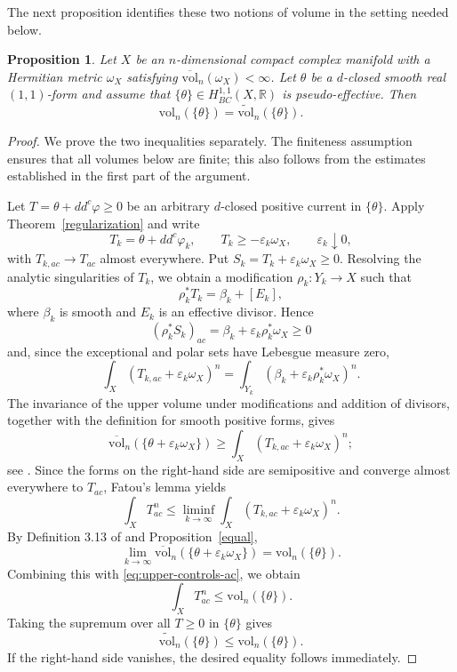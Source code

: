 \documentclass[11pt,letterpaper]{amsart}
\numberwithin{equation}{section}
\newcommand{\RR}{\mathbb{R}}
\newtheorem{prop}{Proposition}[section]
\begin{document}
The next proposition identifies these two notions of volume in the setting needed below.
\begin{prop}\label{good}
Let $X$ be an $n$-dimensional compact complex manifold with a Hermitian metric
$\omega_X$ satisfying $\overline{\mathrm{vol}}_n(\omega_X)<\infty$. Let
$\theta$ be a $d$-closed smooth real $(1,1)$-form and assume that $\{\theta\}\in H^{1,1}_{BC}(X,\RR)$ is pseudo-effective. Then
\[
 \mathrm{vol}_n(\{\theta\})=\widetilde{\mathrm{vol}}_n(\{\theta\}).
\]
\end{prop}
\begin{proof}
We prove the two inequalities separately. The finiteness assumption ensures that all volumes below are finite; this also follows from the estimates established in the first part of the argument.

Let $T=\theta+dd^c\varphi\ge0$ be an arbitrary $d$-closed positive current in
$\{\theta\}$. Apply Theorem~\ref{regularization} and write
\[
 T_k=\theta+dd^c\varphi_k,\qquad
 T_k\ge-\varepsilon_k\omega_X,\qquad
 \varepsilon_k\downarrow0,
\]
with $T_{k,ac}\to T_{ac}$ almost everywhere. Put
$S_k=T_k+\varepsilon_k\omega_X\ge0$. Resolving the analytic singularities of
$T_k$, we obtain a modification $\rho_k:Y_k\to X$ such that
\[
 \rho_k^*T_k=\beta_k+[E_k],
\]
where $\beta_k$ is smooth and $E_k$ is an effective divisor. Hence
\[
 (\rho_k^*S_k)_{ac}=\beta_k+\varepsilon_k\rho_k^*\omega_X\ge0
\]
and, since the exceptional and polar sets have Lebesgue measure zero,
\begin{equation}\label{eq:regularized-ac-mass}
 \int_X(T_{k,ac}+\varepsilon_k\omega_X)^n
 =\int_{Y_k}(\beta_k+\varepsilon_k\rho_k^*\omega_X)^n.
\end{equation}
The invariance of the upper volume under modifications and addition of divisors, together with the definition for smooth positive forms, gives
\begin{equation}\label{eq:upper-controls-ac}
 \overline{\mathrm{vol}}_n(\{\theta+\varepsilon_k\omega_X\})
 \ge \int_X(T_{k,ac}+\varepsilon_k\omega_X)^n;
\end{equation}
see \cite[Lemma 3.5 and Definition 3.8]{BGL}. Since the forms on the right-hand
side are semipositive and converge almost everywhere to $T_{ac}$, Fatou's lemma
yields
\[
 \int_XT_{ac}^n
 \le\liminf_{k\to\infty}
 \int_X(T_{k,ac}+\varepsilon_k\omega_X)^n.
\]
By Definition 3.13 of \cite{BGL} and Proposition~\ref{equal},
\[
 \lim_{k\to\infty}
 \overline{\mathrm{vol}}_n(\{\theta+\varepsilon_k\omega_X\})
 =\mathrm{vol}_n(\{\theta\}).
\]
Combining this with \eqref{eq:upper-controls-ac}, we obtain
\[
 \int_XT_{ac}^n\le\mathrm{vol}_n(\{\theta\}).
\]
Taking the supremum over all $T\ge0$ in $\{\theta\}$ gives
\begin{equation}\label{eq:tilde-le-volume}
 \widetilde{\mathrm{vol}}_n(\{\theta\})
 \le\mathrm{vol}_n(\{\theta\}).
\end{equation}
If the right-hand side vanishes, the desired equality follows immediately.


\end{proof}
\end{document}
